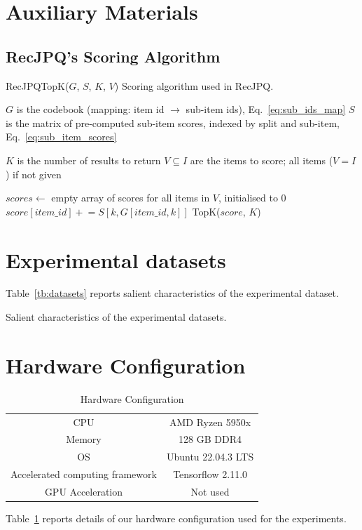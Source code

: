\documentclass[sigconf,natbib=true, review=true]{acmart} %
\newcommand{\pluseq}{\mathrel{+}=}
\begin{document}

\balance

\clearpage
\appendix
\section{Auxiliary Materials}
\subsection{RecJPQ's Scoring Algorithm}
\begin{algorithm}[h]
\small
\caption{RecJPQTopK($G$, $S$, $K$, $V$) Scoring algorithm used in RecJPQ.}\label{alg:RecJPQtop_k}
\begin{algorithmic}[1]
   \Require $G$ is the codebook (mapping: item id $\rightarrow$ sub-item ids), Eq.~\eqref{eq:sub_ids_map}
   \Require $S$ is the matrix of pre-computed sub-item scores, indexed by split and sub-item, Eq.~\eqref{eq:sub_item_scores}

    

   \Require $K$ is the number of results to return
   \Require $V \subseteq I$ are the items to score; all items ($V = I$)  if not given 
   
   \State $scores \gets$ empty array of scores for all items in $V$, initialised to 0
    
            \State $score[item\_id]  \pluseq S[k,G[item\_id,k]] $ 
        \EndFor
   \EndFor
   \State \Return TopK($score$, $K$) 
\end{algorithmic}
\end{algorithm}

\section{Experimental datasets}
Table~\ref{tb:datasets} reports salient characteristics of the experimental dataset. 
\begin{table}[tb]
\caption{Salient characteristics of the experimental datasets.} \label{tb:datasets}
    \resizebox{\linewidth}{!}{
      
}
\end{table}

\section{Hardware Configuration}
\begin{table}[tb]
    \centering
    
    \begin{tabular}{c|c}
        \toprule
         CPU & AMD Ryzen 5950x  \\
         Memory & 128 GB DDR4 \\ 
         OS & Ubuntu 22.04.3 LTS  \\
         Accelerated computing framework & Tensorflow 2.11.0 \\
         GPU Acceleration & Not used\\
         \bottomrule
    \end{tabular}
    \caption{Hardware Configuration}
    \label{tb:hardware}
\end{table}
Table~\ref{tb:hardware} reports details of our hardware configuration used for the experiments. 
\end{document}
